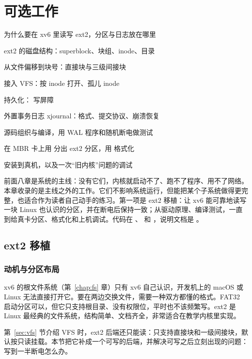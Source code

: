 \chapter{可选工作}
\label{chap:optional}

\begin{introduction}[本章内容]
  \item 为什么要在 xv6 里读写 ext2，分区与日志放在哪里
  \item ext2 的磁盘结构：superblock、块组、inode、目录
  \item 从文件偏移到块号：直接块与三级间接块
  \item 接入 VFS：按 inode 打开、孤儿 inode
  \item 持久化： 写屏障
  \item 外置事务日志 xjournal：格式、提交协议、崩溃恢复
  \item 源码组织与编译，用 WAL 程序和随机断电做测试
  \item 在 MBR 卡上用  分出 ext2 分区，用  格式化
  \item 安装到真机，以及一次“旧内核”问题的调试
\end{introduction}

前面八章是系统的主线：没有它们，内核就启动不了、跑不了程序、用不了网络。本章收录的是主线之外的工作。它们不影响系统运行，但能把某个子系统做得更完整，也适合作为读者自己动手的练习。第一项是 ext2 移植：让 xv6 能可靠地读写一块 Linux 也认识的分区，并在断电后保持一致；从驱动原理、编译测试，一直到给真卡分区、格式化和上机调试。代码在 、 和 ，说明文档是 。

\section{ext2 移植}
\label{sec:ext2}

\subsection{动机与分区布局}

xv6 的根文件系统（第~\ref{chap:fs} 章）只有 xv6 自己认识，开发机上的 macOS 或 Linux 无法直接打开它。要在两边交换文件，需要一种双方都懂的格式。FAT32 启动分区可以，但它只支持根目录、没有权限位，平时也不该频繁写。ext2 是 Linux 最经典的文件系统，结构简单、文档齐全，非常适合在教学内核里实现。

第~\ref{sec:vfs} 节介绍 VFS 时，ext2 后端还只能读：只支持直接块和一级间接块，默认按只读挂载。本节把它补成一个可写的后端，并解决可写之后立刻出现的问题：写到一半断电怎么办。

